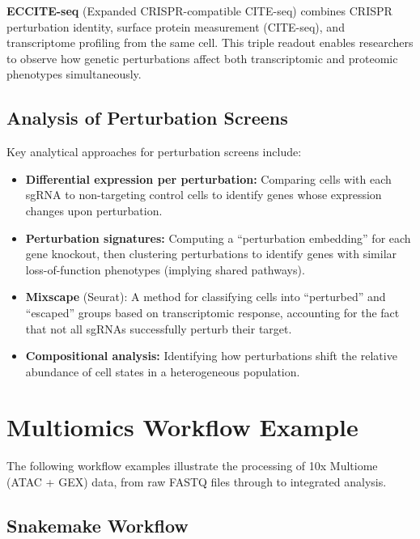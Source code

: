 \textbf{ECCITE-seq} (Expanded CRISPR-compatible CITE-seq) combines CRISPR perturbation identity, surface protein measurement (CITE-seq), and transcriptome profiling from the same cell. This triple readout enables researchers to observe how genetic perturbations affect both transcriptomic and proteomic phenotypes simultaneously.

\subsection{Analysis of Perturbation Screens}
\label{subsec:multiomics:perturbation-analysis}

Key analytical approaches for perturbation screens include:

\begin{itemize}[itemsep=3pt]
  \item \textbf{Differential expression per perturbation:} Comparing cells with each sgRNA to non-targeting control cells to identify genes whose expression changes upon perturbation.
  \item \textbf{Perturbation signatures:} Computing a ``perturbation embedding'' for each gene knockout, then clustering perturbations to identify genes with similar loss-of-function phenotypes (implying shared pathways).
  \item \textbf{Mixscape} (Seurat): A method for classifying cells into ``perturbed'' and ``escaped'' groups based on transcriptomic response, accounting for the fact that not all sgRNAs successfully perturb their target.
  \item \textbf{Compositional analysis:} Identifying how perturbations shift the relative abundance of cell states in a heterogeneous population.
\end{itemize}


\section{Multiomics Workflow Example}
\label{sec:multiomics:workflow}

The following workflow examples illustrate the processing of 10x Multiome (ATAC + GEX) data, from raw FASTQ files through to integrated analysis.

\subsection{Snakemake Workflow}
\label{subsec:multiomics:snakemake}

